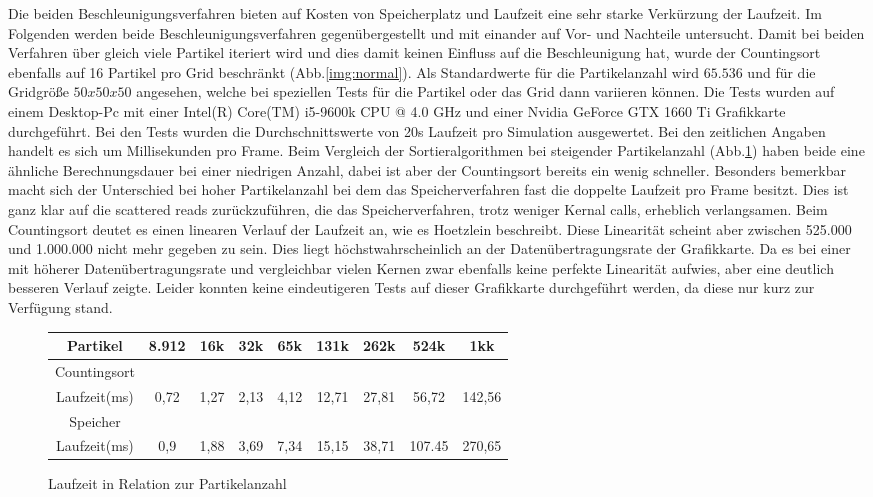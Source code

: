 \documentclass[intern,palatino]{cgBA}
\begin{document}
Die beiden Beschleunigungsverfahren bieten auf Kosten von Speicherplatz und Laufzeit eine sehr starke Verkürzung der Laufzeit. Im Folgenden werden beide Beschleunigungsverfahren gegenübergestellt und mit einander auf Vor- und Nachteile untersucht.
\newline
Damit bei beiden Verfahren über gleich viele Partikel iteriert wird und dies damit keinen Einfluss auf die Beschleunigung hat, wurde der Countingsort ebenfalls auf 16 Partikel pro Grid beschränkt (Abb.\ref{img:normal}). Als Standardwerte für die Partikelanzahl wird $65.536$ und für die Gridgröße $50x50x50$ angesehen, welche bei speziellen Tests für die Partikel oder das Grid dann variieren können.
\newline
Die Tests wurden auf einem Desktop-Pc mit einer Intel(R) Core(TM) i5-9600k CPU @ 4.0 GHz und einer Nvidia GeForce GTX 1660 Ti Grafikkarte durchgeführt. Bei den Tests wurden die Durchschnittswerte von 20s Laufzeit pro Simulation ausgewertet. Bei den zeitlichen Angaben handelt es sich um Millisekunden pro Frame.
\newline
Beim Vergleich der Sortieralgorithmen bei steigender Partikelanzahl (Abb.\ref{tab:particle}) haben beide eine ähnliche Berechnungsdauer bei einer niedrigen Anzahl, dabei ist aber der Countingsort bereits ein wenig schneller. Besonders bemerkbar macht sich der Unterschied bei hoher Partikelanzahl bei dem das Speicherverfahren fast die doppelte Laufzeit pro Frame besitzt. Dies ist ganz klar auf die scattered reads zurückzuführen, die das Speicherverfahren, trotz weniger Kernal calls, erheblich verlangsamen. Beim Countingsort deutet es einen linearen Verlauf der Laufzeit an, wie es Hoetzlein \cite{nvidia} beschreibt. Diese Linearität scheint aber zwischen 525.000 und 1.000.000 nicht mehr gegeben zu sein. Dies liegt höchstwahrscheinlich an der Datenübertragungsrate der Grafikkarte. Da es bei einer mit höherer Datenübertragungsrate und vergleichbar vielen Kernen zwar ebenfalls keine perfekte Linearität aufwies, aber eine deutlich besseren Verlauf zeigte. Leider konnten keine eindeutigeren Tests auf dieser Grafikkarte durchgeführt werden, da diese nur kurz zur Verfügung stand.  

\begin{figure}[H]
	\centering
	\begin{tabular}{ | c || c | c | c | c | c | c | c | c |}
		\hline
		Partikel			&  8.912 & 16k & 32k & 65k & 131k & 262k & 524k & 1kk	\\ \hline
		Countingsort														\\ \hline
		Laufzeit(ms)		&   0,72 &  1,27 &  2,13 &  4,12 &  12,71 &  27,81 &  56,72 &  142,56		 	\\ \hline
		
		Speicher															\\ \hline
		Laufzeit(ms)		&   0,9 &  1,88 &  3,69 &  7,34 &  15,15 &  38,71 &  107.45 &  270,65	\\
		\hline
	\end{tabular}
	\caption{Laufzeit in Relation zur Partikelanzahl}
	\label{tab:particle}
\end{figure}
\end{document}
